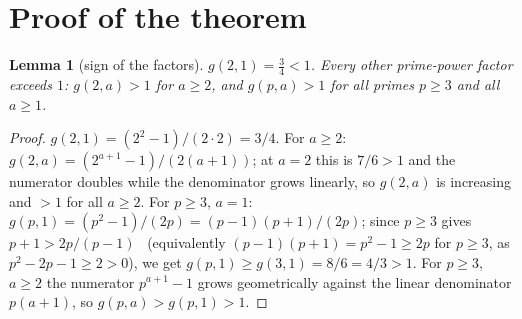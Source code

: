 \documentclass[11pt,a4paper]{article}
\theoremstyle{plain}
\newtheorem{lemma}{Lemma}
\theoremstyle{definition}
\begin{document}
\section{Proof of the theorem}
\label{sec:proof}

\begin{lemma}[sign of the factors]
\label{lem:sign}
$g(2,1)=\tfrac34<1$. Every other prime-power factor exceeds $1$: $g(2,a)>1$ for
$a\ge2$, and $g(p,a)>1$ for all primes $p\ge3$ and all $a\ge1$.
\end{lemma}
\begin{proof}
$g(2,1)=(2^2-1)/(2\cdot2)=3/4$. For $a\ge2$:
$g(2,a)=(2^{a+1}-1)/(2(a+1))$; at $a=2$ this is $7/6>1$ and the numerator
doubles while the denominator grows linearly, so $g(2,a)$ is increasing and
$>1$ for all $a\ge2$. For $p\ge3$, $a=1$:
$g(p,1)=(p^2-1)/(2p)=(p-1)(p+1)/(2p)$; since $p\ge3$ gives $p+1>2p/(p-1)$ \,
(equivalently $(p-1)(p+1)=p^2-1\ge2p$ for $p\ge3$, as $p^2-2p-1\ge2>0$),
we get $g(p,1)\ge g(3,1)=8/6=4/3>1$. For $p\ge3$, $a\ge2$ the numerator
$p^{a+1}-1$ grows geometrically against the linear denominator $p(a+1)$, so
$g(p,a)>g(p,1)>1$.
\end{proof}
\end{document}
